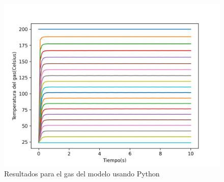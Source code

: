 \documentclass[12pt,letterpaper,final]{article}%
\begin{document}
		\begin{figure}[ht!]
			\includegraphics[scale=0.6]{temp_gas_lopez.png}
			\caption{Resultados para el gas del modelo usando Python}
		\end{figure}
\end{document}
